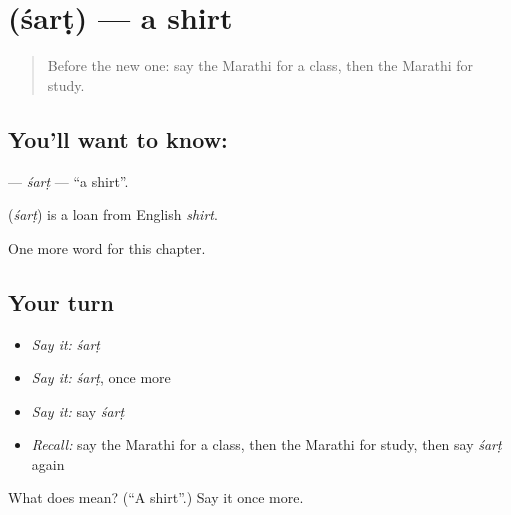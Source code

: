 \section[\texorpdfstring{\mr{शर्ट} (śarṭ)}{शर्ट (śarṭ)}]{ (śarṭ) — a shirt}

\label{lesson:MR-C135-sart}



\begin{quote}
Before the new one: say the Marathi for a class, then the Marathi for study.
\end{quote}

\subsection*{You'll want to know: }
\textbf{} — \emph{śarṭ} — \textquotedblleft{}a shirt\textquotedblright{}.

\begin{cousinweb}
\textbf{} (\emph{śarṭ}) is a loan from English \emph{shirt}.
\end{cousinweb}

\begin{grammarlens}[title={What you've built}]
One more word for this chapter.
\end{grammarlens}

\subsection*{Your turn}
\begin{itemize}
\raggedright
  \item \emph{Say it:} \emph{śarṭ}
  \item \emph{Say it:} \emph{śarṭ}, once more
  \item \emph{Say it:} say \emph{śarṭ}
  \item \emph{Recall:} say the Marathi for a class, then the Marathi for study, then say \emph{śarṭ} again
\end{itemize}

\begin{tcolorbox}[breakable,colback=teal!4,colframe=teal!35!black,title={Before you move on}]
What does  mean? (\textquotedblleft{}A shirt\textquotedblright{}.) Say it once more.
\end{tcolorbox}

